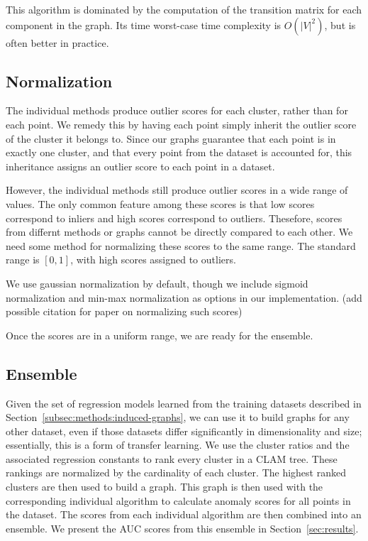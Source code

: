 This algorithm is dominated by the computation of the transition matrix for each component in the graph.
Its time worst-case time complexity is $O(|V|^2)$, but is often better in practice.


\subsection{Normalization}\label{subsec:methods:normalization}
The individual methods produce outlier scores for each cluster, rather than for each point.
We remedy this by having each point simply inherit the outlier score of the cluster it belongs to.
Since our graphs guarantee that each point is in exactly one cluster, and that every point from the dataset is accounted for, this inheritance assigns an outlier score to each point in a dataset.

However, the individual methods still produce outlier scores in a wide range of values.
The only common feature among these scores is that low scores correspond to inliers and high scores correspond to outliers.
Thesefore, scores from differnt methods or graphs cannot be directly compared to each other.
We need some method for normalizing these scores to the same range.
The standard range is $[0, 1]$, with high scores assigned to outliers.

We use gaussian normalization by default, though we include sigmoid normalization and min-max normalization as options in our implementation. (add possible citation for paper on normalizing such scores)


Once the scores are in a uniform range, we are ready for the ensemble.


\subsection{Ensemble}\label{subsec:methods:ensemble}
Given the set of regression models learned from the training datasets described in Section~\ref{subsec:methods:induced-graphs}, we can use it to build graphs for any other dataset, even if those datasets differ significantly in dimensionality and size; essentially, this is a form of transfer learning.
We use the cluster ratios and the associated regression constants to rank every cluster in a CLAM tree.
These rankings are normalized by the cardinality of each cluster.
The highest ranked clusters are then used to build a graph.
This graph is then used with the corresponding individual algorithm to calculate anomaly scores for all points in the dataset.
The scores from each individual algorithm are then combined into an ensemble.
We present the AUC scores from this ensemble in Section~\ref{sec:results}.

